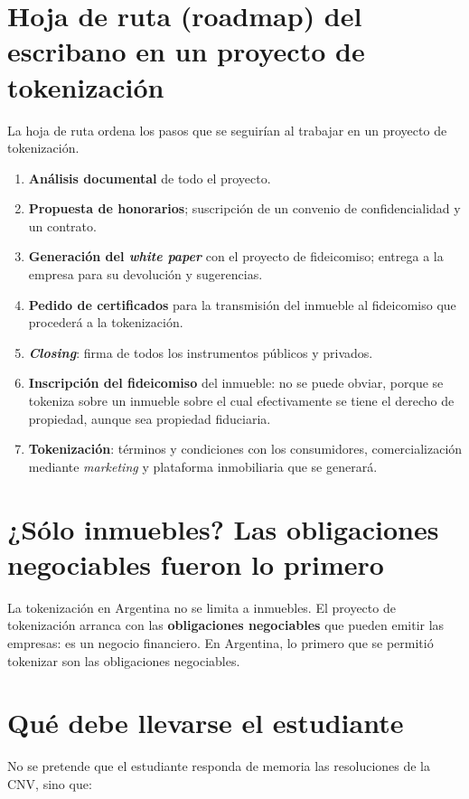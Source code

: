 \documentclass[12pt,oneside]{book}
\begin{document}
\section{Hoja de ruta (roadmap) del escribano en un proyecto de tokenización}

La hoja de ruta ordena los pasos que se seguirían al trabajar en un proyecto de tokenización.

\begin{enumerate}
    \item \textbf{Análisis documental} de todo el proyecto.
    \item \textbf{Propuesta de honorarios}; suscripción de un convenio de confidencialidad y un contrato.
    \item \textbf{Generación del \textit{white paper}} con el proyecto de fideicomiso; entrega a la empresa para su devolución y sugerencias.
    \item \textbf{Pedido de certificados} para la transmisión del inmueble al fideicomiso que procederá a la tokenización.
    \item \textbf{\textit{Closing}}: firma de todos los instrumentos públicos y privados.
    \item \textbf{Inscripción del fideicomiso} del inmueble: no se puede obviar, porque se tokeniza sobre un inmueble sobre el cual efectivamente se tiene el derecho de propiedad, aunque sea propiedad fiduciaria.
    \item \textbf{Tokenización}: términos y condiciones con los consumidores, comercialización mediante \textit{marketing} y plataforma inmobiliaria que se generará.
\end{enumerate}

\section{¿Sólo inmuebles? Las obligaciones negociables fueron lo primero}

La tokenización en Argentina no se limita a inmuebles. El proyecto de tokenización arranca con las \textbf{obligaciones negociables} que pueden emitir las empresas: es un negocio financiero. En Argentina, lo primero que se permitió tokenizar son las obligaciones negociables.

\section{Qué debe llevarse el estudiante}

No se pretende que el estudiante responda de memoria las resoluciones de la CNV, sino que:
\end{document}

